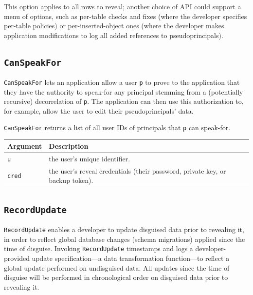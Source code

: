 This option applies to all rows to reveal; another choice of API
could support a menu of options, such as per-table checks and fixes
(where the developer specifies per-table policies) or
per-inserted-object ones (where the developer makes application
modifications to log all added references to pseudoprincipals).

\subsection{\texttt{CanSpeakFor}}
    \texttt{CanSpeakFor} lets an application allow a user \texttt{p} to prove to
    the application that they have the authority to speak-for any principal
    stemming from a (potentially recursive) decorrelation of \texttt{p}. The
    application can then use this authorization to, for example, allow the user
    to edit their pseudoprincipals' data.
    
    \texttt{CanSpeakFor} returns a list of all user IDs of principals that
    \texttt{p} can speak-for.

\begin{center}
    \begin{longtable}{|m{}|m{}|}
        \hline
        \textbf{Argument} & \textbf{Description} \\
        \hline
             \texttt{u}& the user's unique identifier. \\
        \hline
             \texttt{cred}& the user's reveal credentials (their password, private key, or
    backup token).\\
        \hline
    \end{longtable}
    \end{center}
   
    
\subsection{\texttt{RecordUpdate}}
\label{s:semantics:updates}

\texttt{RecordUpdate} enables a developer to update disguised data prior to
revealing it, in order to reflect global database changes (\eg schema migrations)
applied since the time of disguise.
%
Invoking \texttt{RecordUpdate} timestamps and logs a developer-provided update
specification---a data transformation function---to reflect a global update
performed on undisguised data. All updates since the time of disguise will be
performed in chronological order on disguised data prior to revealing it.

